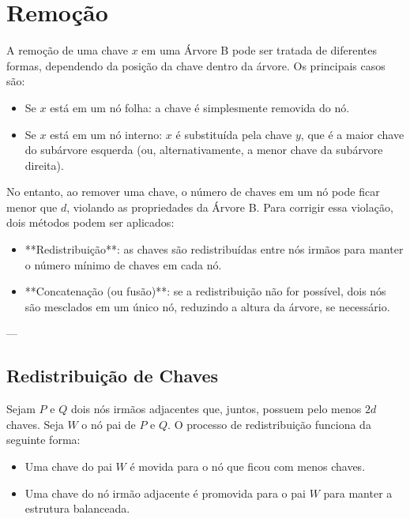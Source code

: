 \section{Remoção}

A remoção de uma chave \( x \) em uma Árvore B pode ser tratada de diferentes formas, 
dependendo da posição da chave dentro da árvore. Os principais casos são:

\begin{itemize}
    \item Se \( x \) está em um nó folha: a chave é simplesmente removida do nó.
    \item Se \( x \) está em um nó interno: \( x \) é substituída pela chave \( y \), que é 
    a maior chave do subárvore esquerda (ou, alternativamente, a menor chave da subárvore direita).
\end{itemize}

No entanto, ao remover uma chave, o número de chaves em um nó pode ficar menor que \( d \), 
violando as propriedades da Árvore B. Para corrigir essa violação, dois métodos podem ser aplicados:

\begin{itemize}
    \item **Redistribuição**: as chaves são redistribuídas entre nós irmãos para manter o número 
    mínimo de chaves em cada nó.
    \item **Concatenação (ou fusão)**: se a redistribuição não for possível, dois nós são mesclados 
    em um único nó, reduzindo a altura da árvore, se necessário.
\end{itemize}

---

\subsection{Redistribuição de Chaves}

Sejam \( P \) e \( Q \) dois nós irmãos adjacentes que, juntos, possuem pelo menos \( 2d \) chaves. 
Seja \( W \) o nó pai de \( P \) e \( Q \). O processo de redistribuição funciona da seguinte forma:

\begin{itemize}
    \item Uma chave do pai \( W \) é movida para o nó que ficou com menos chaves.
    \item Uma chave do nó irmão adjacente é promovida para o pai \( W \) para manter a estrutura balanceada.
\end{itemize}

